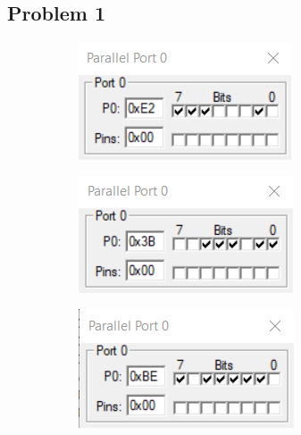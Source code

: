 \documentclass{lab_sheet}
\begin{document}
\subsection*{Problem 1}
\begin{figure}[H]
\begin{subfigure}{.5\textwidth}
  \centering
  \includegraphics[frame,width=.8\linewidth]{../Figures/1_1_a.png}  
  \label{fig:prob1-a}
  \caption{}
\end{subfigure}
\begin{subfigure}{.5\textwidth}
  \centering
  \includegraphics[frame,width=.8\linewidth]{../Figures/1_1_b.png}  
  \label{fig:prob1-b}
  \caption{}
\end{subfigure}
\newline
\begin{subfigure}{.5\textwidth}
  \centering
    \includegraphics[frame,width=.8\linewidth]{../Figures/1_1_c.png}  

\end{subfigure}
\end{figure}
\end{document}
